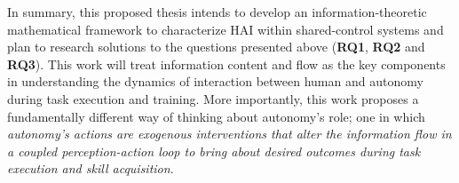 \documentclass[12pt]{article}
\newcommand{\POINTS}[1]{{\textbf{\color{red}{#1}}}}
\begin{document}
In summary, this proposed thesis intends to develop an information-theoretic mathematical framework to characterize HAI within shared-control systems and plan to research solutions to the questions presented above (\textbf{RQ1}, \textbf{RQ2} and \textbf{RQ3}). This work will treat information content and flow as the key components in understanding the dynamics of interaction between human and autonomy during task execution and training. More importantly, this work proposes a fundamentally different way of thinking about autonomy's role; one in which \textit{autonomy's actions are exogenous interventions that alter the information flow in a coupled perception-action loop to bring about desired outcomes during task execution and skill acquisition}.



%





\end{document}
